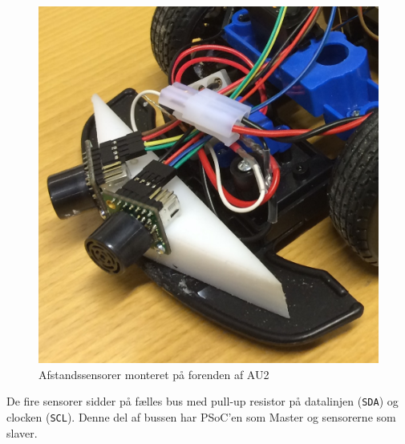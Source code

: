 \begin{figure}[ht]
	\centering
	\includegraphics[scale=0.1]{../fig/billeder/distancesensor_montering.jpg}
	\caption{Afstandssensorer monteret på forenden af AU2}
	\label{fig:ds_mont}
\end{figure}

De fire sensorer sidder på fælles \IIC bus med pull-up resistor på datalinjen (\texttt{SDA}) og clocken (\texttt{SCL}). Denne del af bussen har PSoC'en som Master og sensorerne som slaver. 


